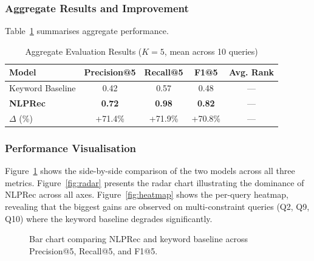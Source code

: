 \documentclass[12pt, a4paper]{article}
\begin{document}
\subsubsection{Aggregate Results and Improvement}

Table~\ref{tab:aggregate} summarises aggregate performance.

\begin{table}[htbp]
\centering
\caption{Aggregate Evaluation Results ($K=5$, mean across 10 queries)}
\label{tab:aggregate}
\renewcommand{\arraystretch}{1.3}
\begin{tabular}{lcccc}
\toprule
\textbf{Model} & \textbf{Precision@5} & \textbf{Recall@5} & \textbf{F1@5}
               & \textbf{Avg. Rank} \\
\midrule
Keyword Baseline   & 0.42 & 0.57 & 0.48 & — \\
\textbf{NLPRec}   & \textbf{0.72} & \textbf{0.98} & \textbf{0.82} & — \\
\midrule
$\Delta$ (\%)     & +71.4\% & +71.9\% & +70.8\% & — \\
\bottomrule
\end{tabular}
\end{table}

\subsubsection{Performance Visualisation}

Figure~\ref{fig:barchart} shows the side-by-side comparison of the two models across all three
metrics. Figure~\ref{fig:radar} presents the radar chart illustrating the dominance of NLPRec
across all axes. Figure~\ref{fig:heatmap} shows the per-query heatmap, revealing that the biggest
gains are observed on multi-constraint queries (Q2, Q9, Q10) where the keyword baseline degrades
significantly.

\begin{figure}[htbp]
\centering
{}
\caption{Bar chart comparing NLPRec and keyword baseline across Precision@5, Recall@5, and F1@5.}
\label{fig:barchart}
\end{figure}
\end{document}
